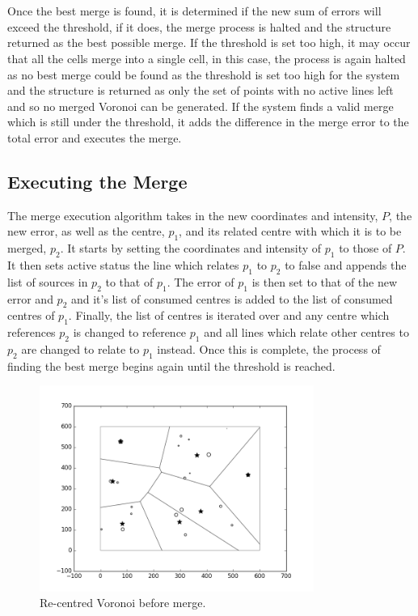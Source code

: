 \\
\\
Once the best merge is found, it is determined if the new sum of errors will exceed the threshold, if it does, the merge process is halted and the structure returned as the best possible merge. If the threshold is set too high, it may occur that all the cells merge into a single cell, in this case, the process is again halted as no best merge could be found as the threshold is set too high for the system and the structure is returned as only the set of points with no active lines left and so no merged Voronoi can be generated. If the system finds a valid merge which is still under the threshold, it adds the difference in the merge error to the total error and executes the merge.

\subsection{Executing the Merge}
The merge execution algorithm takes in the new coordinates and intensity, $P$, the new error, as well as the centre, $p_1$, and its related centre with which it is to be merged, $p_2$. It starts by setting the coordinates and intensity of $p_1$ to those of $P$. It then sets active status the line which relates $p_1$ to $p_2$ to false and appends the list of sources in $p_2$ to that of $p_1$. The error of $p_1$ is then set to that of the new error and $p_2$ and it's list of consumed centres is added to the list of consumed centres of $p_1$. Finally, the list of centres is iterated over and any centre which references $p_2$ is changed to reference $p_1$ and all lines which relate other centres to $p_2$ are changed to relate to $p_1$ instead. Once this is complete, the process of finding the best merge begins again until the threshold is reached.
\begin{figure}[H]
  \centering
  \includegraphics[width=0.8\textwidth]{Images/1merge1.png}
  \caption{Re-centred Voronoi before merge.}
  \label{fig:1merge1}
\end{figure}
